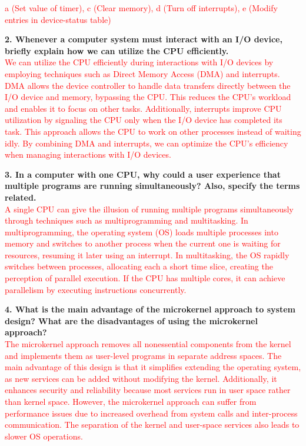 \documentclass[12pt]{article}
\begin{document}
\textcolor{red}{a (Set value of timer), c (Clear memory), d (Turn off interrupts), e (Modify entries in device-status table)}


\vspace{90pt}


\noindent \textbf{2. Whenever a computer system must interact with an I/O device, briefly explain how we can utilize the CPU efficiently.} \\

\textcolor{red}{We can utilize the CPU efficiently during interactions with I/O devices by employing techniques such as Direct Memory Access (DMA) and interrupts. DMA allows the device controller to handle data transfers directly between the I/O device and memory, bypassing the CPU. This reduces the CPU's workload and enables it to focus on other tasks. Additionally, interrupts improve CPU utilization by signaling the CPU only when the I/O device has completed its task. This approach allows the CPU to work on other processes instead of waiting idly. By combining DMA and interrupts, we can optimize the CPU's efficiency when managing interactions with I/O devices.}
\newpage

\noindent \textbf{3. In a computer with one CPU, why could a user experience that multiple programs are running simultaneously? Also, specify the terms related.} \\

\textcolor{red}{A single CPU can give the illusion of running multiple programs simultaneously through techniques such as multiprogramming and multitasking. In multiprogramming, the operating system (OS) loads multiple processes into memory and switches to another process when the current one is waiting for resources, resuming it later using an interrupt. In multitasking, the OS rapidly switches between processes, allocating each a short time slice, creating the perception of parallel execution. If the CPU has multiple cores, it can achieve parallelism by executing instructions concurrently.}
\newpage

\noindent \textbf{4. What is the main advantage of the microkernel approach to system design? What are the disadvantages of using the microkernel approach?} \\

\textcolor{red}{The microkernel approach removes all nonessential components from the kernel and implements them as user-level programs in separate address spaces. The main advantage of this design is that it simplifies extending the operating system, as new services can be added without modifying the kernel. Additionally, it enhances security and reliability because most services run in user space rather than kernel space. However, the microkernel approach can suffer from performance issues due to increased overhead from system calls and inter-process communication. The separation of the kernel and user-space services also leads to slower OS operations.}
\newpage
\end{document}
